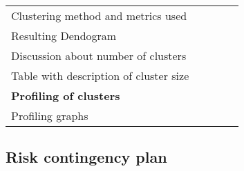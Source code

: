 \begin{table}[H]
\begin{tabular}{@{}l|c|c|c|c@{}}
Clustering method and metrics used              & \X &\x  &    &    \\
Resulting Dendogram                             &    &    &\X   &\x  \\
Discussion about number of clusters             &\x  &\X  &    &    \\
Table with description of cluster size          &\x  &    &\X  &    \\ \midrule
\textbf{Profiling of clusters}                  &    &    &    & \\ 
Profiling graphs                                &    &    &\X  &\x  \\
\end{tabular}
\end{table}

\subsection{Risk contingency plan}%
\label{sub:risk_contingency_plan}



